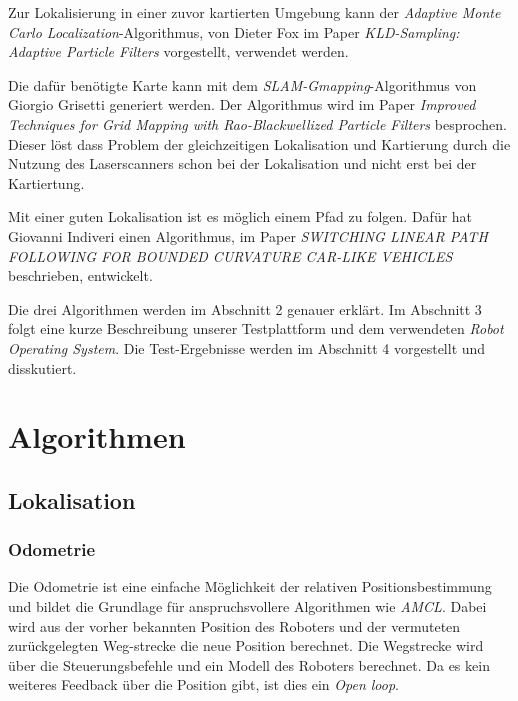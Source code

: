 \documentclass[11pt,a4paper]{article}
\begin{document}
	Zur Lokalisierung in einer zuvor kartierten Umgebung kann der \textit{Adaptive Monte Carlo Localization}-Algorithmus, von Dieter Fox im Paper \textit{KLD-Sampling: Adaptive Particle Filters} \cite{amclPaper} vorgestellt, verwendet werden. 
	
	Die daf\"ur ben\"otigte Karte kann mit dem \textit{SLAM-Gmapping}-Algorithmus von Giorgio Grisetti generiert werden. Der Algorithmus wird im Paper \textit{Improved Techniques for Grid Mapping
	with Rao-Blackwellized Particle Filters} \cite{Gmapping} besprochen. Dieser l\"ost dass Problem der gleichzeitigen Lokalisation und Kartierung durch die Nutzung des Laserscanners schon bei der Lokalisation und nicht erst bei der Kartiertung. 
	
	Mit einer guten Lokalisation ist es m\"oglich einem Pfad zu folgen. Dafür hat Giovanni Indiveri einen Algorithmus, im Paper \textit{SWITCHING
	LINEAR PATH FOLLOWING FOR
	BOUNDED CURVATURE CAR-LIKE
	VEHICLES} \cite{Giovanni} beschrieben, entwickelt. 

	Die drei Algorithmen werden im Abschnitt 2 genauer erkl\"art. Im Abschnitt 3 folgt eine kurze Beschreibung unserer Testplattform und dem verwendeten \textit{Robot Operating System}. Die Test-Ergebnisse werden im Abschnitt 4 vorgestellt und disskutiert.
  

\section{Algorithmen}

\subsection{Lokalisation}
\subsubsection{Odometrie}
{
	Die Odometrie ist eine einfache M\"oglichkeit der relativen Positionsbestimmung und bildet die Grundlage f\"ur anspruchsvollere Algorithmen wie \textit{AMCL}. Dabei wird aus der vorher bekannten Position des Roboters und der vermuteten zur\"uckgelegten Weg-strecke die neue Position berechnet. Die Wegstrecke wird \"uber die Steuerungsbefehle und ein Modell des Roboters berechnet. Da es kein weiteres Feedback \"uber die Position gibt, ist dies ein \textit{Open loop}. 
}
\end{document}
